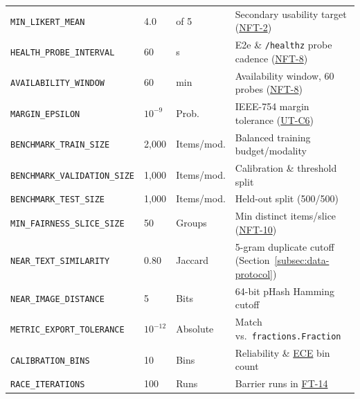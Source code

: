 \documentclass[12pt, titlepage]{article}
\newcommand{\ECE}{\hyperlink{vnv-acr-ece}{ECE}}
\begin{document}
\begin{tabularx}{\textwidth}{Q{4.6cm} P{1.5cm} P{2.2cm} Y}
\label{const:MIN_LIKERT_MEAN}\texttt{MIN\_\allowbreak{}LIKERT\_\allowbreak{}MEAN} & 4.0 & of 5 & Secondary usability target (\hyperref[test:NFT-2]{NFT-2})\\
\label{const:HEALTH_PROBE_INTERVAL}\texttt{HEALTH\_\allowbreak{}PROBE\_\allowbreak{}INTERVAL} & 60 & s & E2e \& \texttt{/healthz} probe cadence (\hyperref[test:NFT-8]{NFT-8})\\
\label{const:AVAILABILITY_WINDOW}\texttt{AVAILABILITY\_\allowbreak{}WINDOW} & 60 & min & Availability window, 60 probes (\hyperref[test:NFT-8]{NFT-8})\\
\label{const:MARGIN_EPSILON}\texttt{MARGIN\_\allowbreak{}EPSILON} & $10^{-9}$ & Prob. & IEEE-754 margin tolerance (\hyperref[ut:C6]{UT-C6})\\
\label{const:BENCHMARK_TRAIN_SIZE}\texttt{BENCHMARK\_\allowbreak{}TRAIN\_\allowbreak{}SIZE} & 2{,}000 & Items/mod. & Balanced training budget/modality\\
\label{const:BENCHMARK_VALIDATION_SIZE}\texttt{BENCHMARK\_\allowbreak{}VALIDATION\_\allowbreak{}SIZE} & 1{,}000 & Items/mod. & Calibration \& threshold split\\
\label{const:BENCHMARK_TEST_SIZE}\texttt{BENCHMARK\_\allowbreak{}TEST\_\allowbreak{}SIZE} & 1{,}000 & Items/mod. & Held-out split (500/500)\\
\label{const:MIN_FAIRNESS_SLICE_SIZE}\texttt{MIN\_\allowbreak{}FAIRNESS\_\allowbreak{}SLICE\_\allowbreak{}SIZE} & 50 & Groups & Min distinct items/slice (\hyperref[test:NFT-10]{NFT-10})\\
\label{const:NEAR_TEXT_SIMILARITY}\texttt{NEAR\_\allowbreak{}TEXT\_\allowbreak{}SIMILARITY} & 0.80 & Jaccard & 5-gram duplicate cutoff (Section~\ref{subsec:data-protocol})\\
\label{const:NEAR_IMAGE_DISTANCE}\texttt{NEAR\_\allowbreak{}IMAGE\_\allowbreak{}DISTANCE} & 5 & Bits & 64-bit pHash Hamming cutoff\\
\label{const:METRIC_EXPORT_TOLERANCE}\texttt{METRIC\_\allowbreak{}EXPORT\_\allowbreak{}TOLERANCE} & $10^{-12}$ & Absolute & Match vs.\ \texttt{fractions.Fraction}\\
\label{const:CALIBRATION_BINS}\texttt{CALIBRATION\_\allowbreak{}BINS} & 10 & Bins & Reliability \& \ECE{} bin count\\
\label{const:RACE_ITERATIONS}\texttt{RACE\_\allowbreak{}ITERATIONS} & 100 & Runs & Barrier runs in \hyperref[test:FT-14]{FT-14}\\
\end{tabularx}
\endgroup
\end{document}
